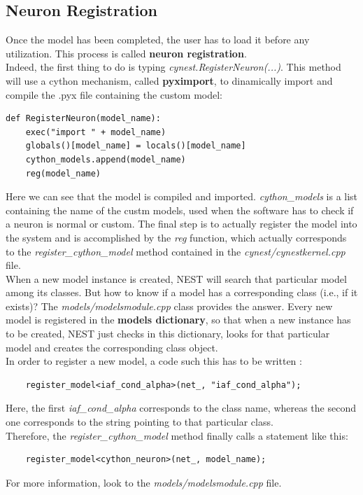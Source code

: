 \documentclass{article}
\begin{document}
\subsection{Neuron Registration}
Once the model has been completed, the user has to load it before any utilization. This process is called \textbf{neuron registration}.\\
Indeed, the first thing to do is typing \emph{cynest.RegisterNeuron(...)}. This method will use a cython mechanism, called \textbf{pyximport}, to dinamically import and compile the .pyx file containing the custom model:
\begin{verbatim}
def RegisterNeuron(model_name):
    exec("import " + model_name)
    globals()[model_name] = locals()[model_name]
    cython_models.append(model_name)
    reg(model_name)
\end{verbatim}
Here we can see that the model is compiled and imported. \emph{cython\_models} is a list containing the name of the custm models, used when the software has to check if a neuron is normal or custom. The final step is to actually register the model into the system and is accomplished by the \emph{reg} function, which actually corresponds to the \emph{register\_cython\_model} method contained in the \emph{cynest/cynestkernel.cpp} file.\\

When a new model instance is created, NEST will search that particular model among its classes. But how to know if a model has a corresponding class (i.e., if it exists)? The \emph{models/modelsmodule.cpp} class provides the answer. Every new model is registered in the \textbf{models dictionary}, so that when a new instance has to be created, NEST just checks in this dictionary, looks for that particular model and creates the corresponding class object.\\
In order to register a new model, a code such this has to be written :
\begin{verbatim}
	register_model<iaf_cond_alpha>(net_, "iaf_cond_alpha");
\end{verbatim}
Here, the first \emph{iaf\_cond\_alpha} corresponds to the class name, whereas the second one corresponds to the string pointing to that particular class.\\
Therefore, the \emph{register\_cython\_model} method finally calls a statement like this:
\begin{verbatim}
	register_model<cython_neuron>(net_, model_name);
\end{verbatim}
For more information, look to the \emph{models/modelsmodule.cpp} file.
\end{document}
